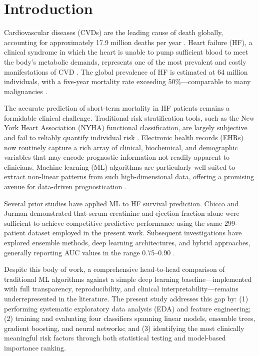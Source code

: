\documentclass[12pt, a4paper]{article}
\begin{document}
\newpage
\section{Introduction}
\label{sec:intro}

Cardiovascular diseases (CVDs) are the leading cause of death globally, 
accounting for approximately 17.9 million deaths per year \cite{who2021}. 
Heart failure (HF), a clinical syndrome in which the heart is unable to pump 
sufficient blood to meet the body's metabolic demands, represents one of the 
most prevalent and costly manifestations of CVD \cite{virani2021}. The global 
prevalence of HF is estimated at 64 million individuals, with a five-year 
mortality rate exceeding 50\%—comparable to many malignancies \cite{groenewegen2020}.

The accurate prediction of short-term mortality in HF patients remains a 
formidable clinical challenge. Traditional risk stratification tools, such as 
the New York Heart Association (NYHA) functional classification, are largely 
subjective and fail to reliably quantify individual risk \cite{raphael2007}. 
Electronic health records (EHRs) now routinely capture a rich array of 
clinical, biochemical, and demographic variables that may encode prognostic 
information not readily apparent to clinicians. Machine learning (ML) 
algorithms are particularly well-suited to extract non-linear patterns from 
such high-dimensional data, offering a promising avenue for data-driven 
prognostication \cite{chicco2020}.

Several prior studies have applied ML to HF survival prediction. Chicco and 
Jurman \cite{chicco2020} demonstrated that serum creatinine and ejection 
fraction alone were sufficient to achieve competitive predictive performance 
using the same 299-patient dataset employed in the present work. Subsequent 
investigations have explored ensemble methods, deep learning architectures, 
and hybrid approaches, generally reporting AUC values in the range 
0.75--0.90 \cite{ahmad2017, hu2021}.

Despite this body of work, a comprehensive head-to-head comparison of 
traditional ML algorithms against a simple deep learning baseline—implemented 
with full transparency, reproducibility, and clinical interpretability—remains 
underrepresented in the literature. The present study addresses this gap by: 
(1) performing systematic exploratory data analysis (EDA) and feature 
engineering; (2) training and evaluating four classifiers spanning linear 
models, ensemble trees, gradient boosting, and neural networks; and 
(3) identifying the most clinically meaningful risk factors through both 
statistical testing and model-based importance ranking.
\end{document}
